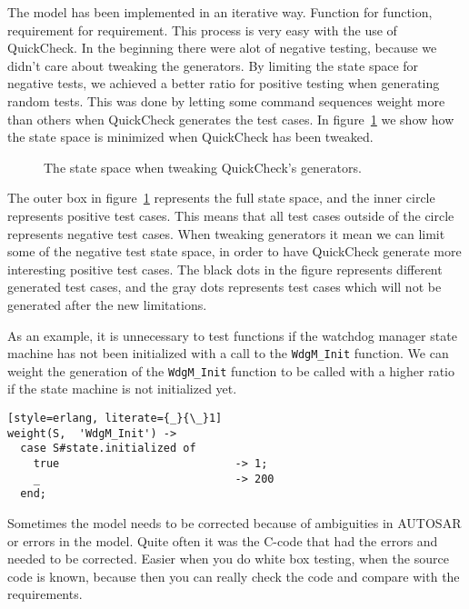 
The model has been implemented in an iterative way. Function for
function, requirement for requirement. This process is very easy with
the use of QuickCheck.  In the beginning there were alot of negative
testing, because we didn't care about tweaking the generators.
By limiting the state space for negative tests, we achieved a better
ratio for positive testing when generating random tests. This was done
by letting some command sequences weight more than others when
QuickCheck generates the test cases. In
figure~\ref{QUICKCHECK:TWEAKING} we show how the state space is
minimized when QuickCheck has been tweaked.

\begin{figure}[!ht]
  \begin{center}
    \begin{minipage}[b]{0.6\linewidth}
      
    \end{minipage}
  \end{center}
  \caption{The state space when tweaking QuickCheck's generators.}
  \label{QUICKCHECK:TWEAKING}
\end{figure}
The outer box in figure~\ref{QUICKCHECK:TWEAKING} represents the full
state space, and the inner circle represents positive test cases. This
means that all test cases outside of the circle represents negative
test cases. When tweaking generators it mean we can limit some of the
negative test state space, in order to have QuickCheck generate more
interesting positive test cases. The black dots in the figure
represents different generated test cases, and the gray dots
represents test cases which will not be generated after the new
limitations.

As an example, it is unnecessary to test functions if the watchdog
manager state machine has not been initialized with a call to the
\lstinline!WdgM_Init! function. We can weight the generation
of the \lstinline!WdgM_Init! function to be called with a higher ratio
if the state machine is not initialized yet.

\begin{lstlisting}[style=erlang, literate={_}{\_}1]
weight(S,  'WdgM_Init') ->
  case S#state.initialized of
    true                           -> 1;
    _                              -> 200
  end;
\end{lstlisting}

Sometimes the model needs to be corrected because of ambiguities in
AUTOSAR or errors in the model. Quite often it was the C-code that had
the errors and needed to be corrected.  Easier when you do white box
testing, when the source code is known, because then you can really
check the code and compare with the requirements.

